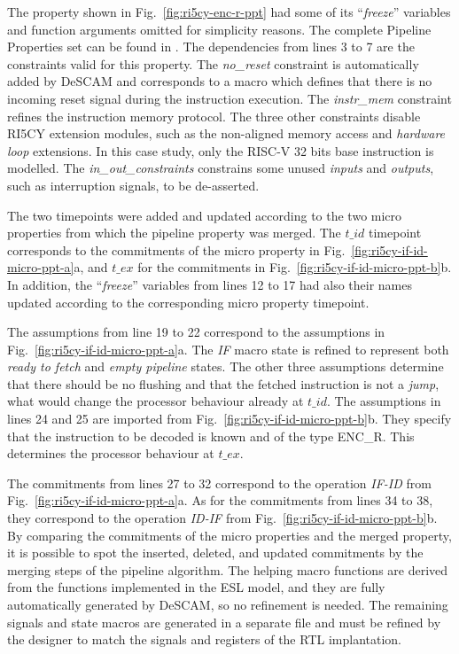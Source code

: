 The property shown in Fig.~\ref{fig:ri5cy-enc-r-ppt} had some of its “\textit{freeze}” variables and function arguments omitted for simplicity reasons. The complete Pipeline Properties set can be found in \cite{descam}. The dependencies from lines 3 to 7 are the constraints valid for this property. The \textit{no\_reset} constraint is automatically added by DeSCAM and corresponds to a macro which defines that there is no incoming reset signal during the instruction execution. The \textit{instr\_mem} constraint refines the instruction memory protocol. The three other constraints disable RI5CY extension modules, such as the non-aligned memory access and \textit{hardware loop} extensions. In this case study, only the RISC-V 32 bits base instruction is modelled. The \textit{in\_out\_constraints} constrains some unused \textit{inputs} and \textit{outputs}, such as interruption signals, to be de-asserted. 

The two timepoints were added and updated according to the two micro properties from which the pipeline property was merged. The $t\_id$ timepoint corresponds to the commitments of the micro property in Fig.~\ref{fig:ri5cy-if-id-micro-ppt-a}a, and $t\_ex$ for the commitments in Fig.~\ref{fig:ri5cy-if-id-micro-ppt-b}b. In addition, the “\textit{freeze}” variables from lines 12 to 17 had also their names updated according to the corresponding micro property timepoint.

The assumptions from line 19 to 22 correspond to the assumptions in Fig.~\ref{fig:ri5cy-if-id-micro-ppt-a}a. The \textit{IF} macro state is refined to represent both \textit{ready to fetch} and \textit{empty pipeline} states. The other three assumptions determine that there should be no flushing and that the fetched instruction is not a \textit{jump}, what would change the processor behaviour already at $t\_id$. The assumptions in lines 24 and 25 are imported from Fig.~\ref{fig:ri5cy-if-id-micro-ppt-b}b. They specify that the instruction to be decoded is known and of the type ENC\_R. This determines the processor behaviour at $t\_ex$.

The commitments from lines 27 to 32 correspond to the operation \textit{IF-ID} from Fig.~\ref{fig:ri5cy-if-id-micro-ppt-a}a. As for the commitments from lines 34 to 38, they correspond to the operation \textit{ID-IF} from Fig.~\ref{fig:ri5cy-if-id-micro-ppt-b}b. By comparing the commitments of the micro properties and the merged property, it is possible to spot the inserted, deleted, and updated commitments by the merging steps of the pipeline algorithm. The helping macro functions are derived from the functions implemented in the ESL model, and they are fully automatically generated by DeSCAM, so no refinement is needed. The remaining signals and state macros are generated in a separate file and must be refined by the designer to match the signals and registers of the RTL implantation. 

